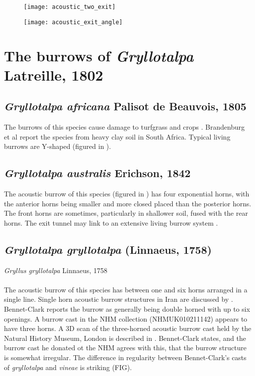 \documentclass{article}
\begin{document}
   \begin{figure}[h]
   	\texttt{[image: acoustic\_two\_exit]}
   	\caption{}
   	\label{fig:acoustic_two_exit}
   \end{figure}
   
   \begin{figure}[h]
   	\texttt{[image: acoustic\_exit\_angle]}
   	\caption{}
   	\label{fig:acoustic_exit_angle}
   \end{figure}
   
   \section{The burrows of \textit{Gryllotalpa} Latreille, 1802}
   
   \subsection{\textit{Gryllotalpa africana} Palisot de Beauvois, 1805 \cite{palisot1805}}
   The burrows of this species cause damage to turfgrass and crops \cite{brandenburg2002}. Brandenburg et al \cite{brandenburg2002} report the species from heavy clay soil in South Africa. Typical living burrows are Y-shaped (figured in \cite{brandenburg2002}).
   
   \subsection{\textit{Gryllotalpa australis} Erichson, 1842 \cite{erichson1842}}
   The acoustic burrow of this species (figured in \cite{kavanagh1989}) has four exponential horns, with the anterior horns being smaller and more closed placed than the posterior horns. The front horns are sometimes, particularly in shallower soil, fused with the rear horns. The exit tunnel may link to an extensive living burrow system \cite{kavanagh1989}.
   
   \subsection{\textit{Gryllotalpa gryllotalpa} (Linnaeus, 1758) \cite{linnaeus1758}}
   \textit{Gryllus gryllotalpa} Linnaeus, 1758
   \paragraph{}
   The acoustic burrow of this species has between one and six horns arranged in a single line. Single horn acoustic burrow structures in Iran are discussed by \cite{jafari2015}. Bennet-Clark \cite{bennetclark1970a} reports the burrow as generally being double horned with up to six openings. A burrow cast in the NHM collection (NHMUK010211142) appears to have three horns. A 3D scan of the three-horned acoustic burrow cast held by the Natural History Museum, London is described in \cite{baker2016}. Bennet-Clark \cite{bennetclark1970a} states, and the burrow cast he donated ot the NHM agrees with this, that the burrow structure is somewhat irregular. The difference in regularity between Bennet-Clark's casts of \textit{gryllotalpa} and \textit{vineae} is striking (FIG).
   
\end{document}
